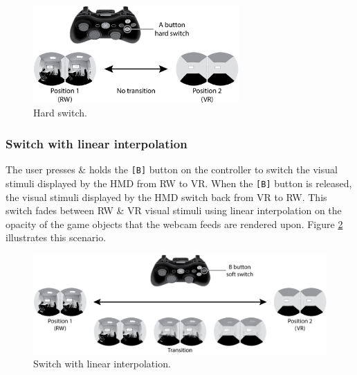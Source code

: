 \begin{figure}[h]
	\begin{center}
		\includegraphics[width=0.7\textwidth]{images/switching-hard-with-controller.png}
		\caption{Hard switch.}
		\label{scenario1}
	\end{center}
\end{figure}

\subsubsection{Switch with linear interpolation}
The user presses \& holds the \texttt{[B]} button on the controller to switch the visual stimuli displayed by the HMD from RW to VR. When the \texttt{[B]} button is released, the visual stimuli displayed by the HMD switch back from VR to RW. This switch fades between RW \& VR  visual stimuli using linear interpolation on the opacity of the game objects that the webcam feeds are rendered upon. Figure \ref{scenario12} illustrates this scenario.

\begin{figure}[h]
	\begin{center}
		\includegraphics[width=\textwidth]{images/switching-soft-with-controller.png}
		\caption{Switch with linear interpolation.}
		\label{scenario12}
	\end{center}
\end{figure}

